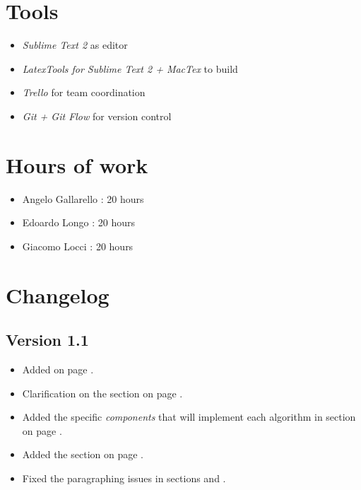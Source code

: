 \newpage
\begin{appendices}
\section{Tools}

\begin{itemize}
	\item \emph{Sublime Text 2} as editor
	\item \emph{LatexTools for Sublime Text 2 + MacTex}  to build
	\item \emph{Trello} for team coordination 
	\item \emph{Git + Git Flow} for version control 
\end{itemize}

\section{Hours of work}

\begin{itemize}
	\item Angelo Gallarello : 20 hours
	\item Edoardo Longo : 20 hours
	\item Giacomo Locci : 20 hours
\end{itemize}

\section{Changelog}
\subsection{Version 1.1} %
\label{par:version_1_1}

\begin{itemize}
	\item Added \emph{} on page \pageref{fig:overview-diagram}.
	\item Clarification on the \emph{} section on page \pageref{ssub:data_caching}.
	\item Added the specific \emph{components} that will implement each algorithm in \emph{} section on page \pageref{sec:algorithm_design}.
	\item Added the \emph{} section on page \pageref{sec:requirements-traceability}.
	\item Fixed the paragraphing issues in sections \emph{} and \emph{}.
\end{itemize}


\end{appendices}